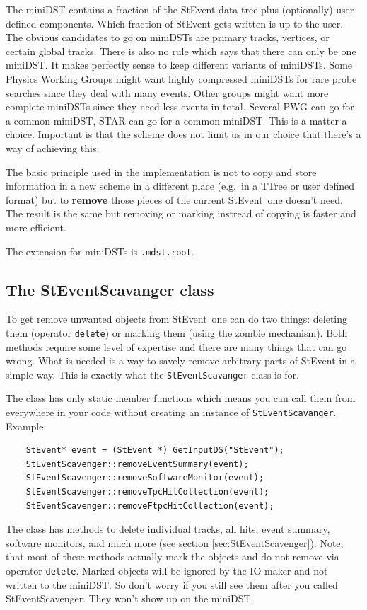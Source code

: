\documentclass[twoside]{article}
\newcommand{\StEvent}{\textsf{StEvent}}
\begin{document}
The miniDST contains a fraction of the StEvent data tree plus
(optionally) user defined components.  Which fraction of StEvent gets
written is up to the user.  The obvious candidates to go on miniDSTs
are primary tracks, vertices, or certain global tracks.  There is also
no rule which says that there can only be one miniDST. It makes
perfectly sense to keep different variants of miniDSTs. Some Physics
Working Groups might want highly compressed miniDSTs for rare probe
searches since they deal with many events. Other groups might want
more complete miniDSTs since they need less events in total.  Several
PWG can go for a common miniDST, STAR can go for a common miniDST.
This is a matter a choice.  Important is that the scheme does not
limit us in our choice that there's a way of achieving this.

The basic principle used in the implementation is not to copy and
store information in a new scheme in a different place (e.g.~in a
TTree or user defined format) but to \textbf{remove} those pieces of
the current \StEvent\ one doesn't need. The result is the same but
removing or marking instread of copying is faster and more efficient.

The extension for miniDSTs is \texttt{.mdst.root}.

\subsection{The StEventScavanger class}
 To get remove unwanted objects from \StEvent\ 
one can do two things: deleting them (operator \texttt{delete}) or
marking them (using the zombie mechanism).  Both methods require some
level of expertise and there are many things that can go wrong.  What
is needed is a way to savely remove arbitrary parts of StEvent in a
simple way. This is exactly what the \texttt{StEventScavanger} class
is for.

The class has only static member functions which means you can call them from
everywhere in your code without creating an instance of \texttt{StEventScavanger}.\\
Example:
\begin{verbatim}
    StEvent* event = (StEvent *) GetInputDS("StEvent");
    StEventScavenger::removeEventSummary(event);
    StEventScavenger::removeSoftwareMonitor(event);
    StEventScavenger::removeTpcHitCollection(event);
    StEventScavenger::removeFtpcHitCollection(event); 
\end{verbatim}
The class has methods to delete individual tracks, all hits, event summary,
software monitors, and much more (see section \ref{sec:StEventScavenger}).
Note, that most of these methods actually mark the objects and do not remove
via operator \texttt{delete}.
Marked objects will be ignored by the IO maker and not written
to the miniDST. So don't worry if you still see them after you called 
StEventScavenger. They won't show up on the miniDST.
\end{document}
